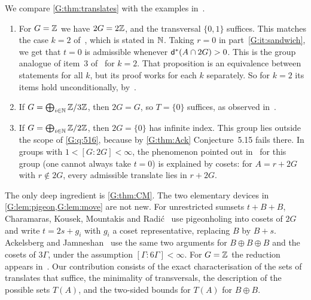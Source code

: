 
\begin{remark}\label{G:rem:examples}
We compare \cref{G:thm:translates} with the examples in~\cite[\S5.3]{kra2023problems}.
\begin{enumerate}[label=\textup{(\arabic*)}]
\item For $G=\mathbb{Z}$ we have $2G=2\mathbb{Z}$, and the transversal $\{0,1\}$ suffices. This matches
the case $k=2$ of~\cite[Proposition~2.6]{kra2023problems}, which is stated in $\mathbb{N}$.
Taking $r=0$ in part~\ref{G:it:sandwich}, we get that $t=0$ is admissible whenever
$\mathsf{d}^*(A\cap2G)>0$. This is the group analogue of item~3
of~\cite[Proposition~2.6]{kra2023problems} for $k=2$. That proposition is an equivalence
between statements for all $k$, but its proof works for each $k$ separately. So for $k=2$
its items hold unconditionally, by~\cite[Theorem~2.2]{kra2023problems}.
\item If $G=\bigoplus_{i\in\mathbb{N}}\mathbb{Z}/3\mathbb{Z}$, then $2G=G$, so $T=\{0\}$ suffices, as observed
in~\cite{kra2023problems}.
\item If $G=\bigoplus_{i\in\mathbb{N}}\mathbb{Z}/2\mathbb{Z}$, then $2G=\{0\}$ has infinite index. This group lies
outside the scope of \cref{G:q:516}, because by \cref{G:thm:Ack} Conjecture~5.15 fails
there. In groups with $1<[G:2G]<\infty$, the phenomenon pointed out
in~\cite{kra2023problems} for this group (one cannot always take $t=0$) is explained by
cosets: for $A=r+2G$ with $r\notin2G$, every admissible translate lies in $r+2G$.
\end{enumerate}
\end{remark}

\begin{remark}[Credit]\label{G:rem:credit}
The only deep ingredient is \cref{G:thm:CM}. The two elementary devices in
\cref{G:lem:pigeon,G:lem:move} are not new. For unrestricted sumsets $t+B+B$,
Charamaras, Kousek, Mountakis and Radi\'c~\cite[Lemmas~2.1 and~2.2]{charamaras2025infinite}
use pigeonholing into cosets of $2G$ and write $t=2s+g_i$ with $g_i$ a coset
representative, replacing $B$ by $B+s$. Ackelsberg and Jamneshan~\cite[discussion after
Theorem~1.9, and Corollary~1.10]{ackelsberg2025equidistribution} use the same two
arguments for $B\oplus B\oplus B$ and the cosets of $3\Gamma$, under the assumption
$[\Gamma:6\Gamma]<\infty$. For $G=\mathbb{Z}$ the reduction
appears in~\cite[Proposition~2.6]{kra2023problems}. Our contribution consists of the exact
characterisation of the sets of translates that suffice, the minimality of transversals,
the description of the possible sets $T(A)$, and the two-sided bounds for $T(A)$ for
$B\oplus B$.
\end{remark}


